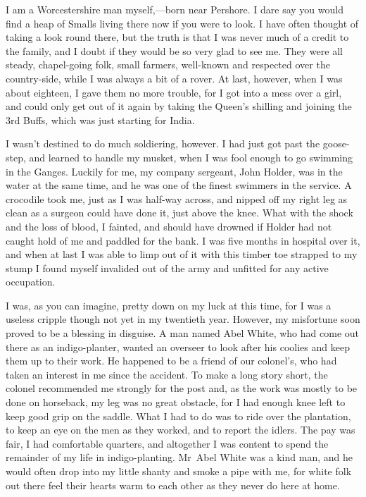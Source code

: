 I am a Worcestershire man myself,—born near Pershore. I dare say you would find a heap of Smalls living there now if you were to look. I have often thought of taking a look round there, but the truth is that I was never much of a credit to the family, and I doubt if they would be so very glad to see me. They were all steady, chapel-going folk, small farmers, well-known and respected over the country-side, while I was always a bit of a rover. At last, however, when I was about eighteen, I gave them no more trouble, for I got into a mess over a girl, and could only get out of it again by taking the Queen's shilling and joining the 3rd Buffs, which was just starting for India.

I wasn't destined to do much soldiering, however. I had just got past the goose-step, and learned to handle my musket, when I was fool enough to go swimming in the Ganges. Luckily for me, my company sergeant, John Holder, was in the water at the same time, and he was one of the finest swimmers in the service. A crocodile took me, just as I was half-way across, and nipped off my right leg as clean as a surgeon could have done it, just above the knee. What with the shock and the loss of blood, I fainted, and should have drowned if Holder had not caught hold of me and paddled for the bank. I was five months in hospital over it, and when at last I was able to limp out of it with this timber toe strapped to my stump I found myself invalided out of the army and unfitted for any active occupation.

I was, as you can imagine, pretty down on my luck at this time, for I was a useless cripple though not yet in my twentieth year. However, my misfortune soon proved to be a blessing in disguise. A man named Abel White, who had come out there as an indigo-planter, wanted an overseer to look after his coolies and keep them up to their work. He happened to be a friend of our colonel's, who had taken an interest in me since the accident. To make a long story short, the colonel recommended me strongly for the post and, as the work was mostly to be done on horseback, my leg was no great obstacle, for I had enough knee left to keep good grip on the saddle. What I had to do was to ride over the plantation, to keep an eye on the men as they worked, and to report the idlers. The pay was fair, I had comfortable quarters, and altogether I was content to spend the remainder of my life in indigo-planting. Mr~Abel White was a kind man, and he would often drop into my little shanty and smoke a pipe with me, for white folk out there feel their hearts warm to each other as they never do here at home.

